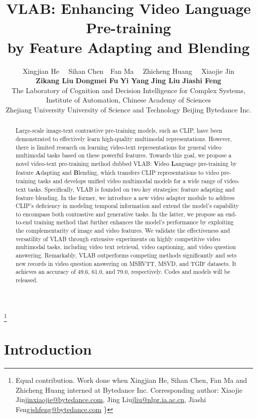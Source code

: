 \documentclass{article}
\title{VLAB: Enhancing Video Language Pre-training \\by Feature Adapting and Blending}
\author{
    Xingjian He \ \
    \enskip Sihan Chen\ \
    \enskip Fan Ma \ \
    \enskip Zhicheng Huang \ \
    \enskip Xiaojie Jin\textsuperscript{\Letter} \\
    \enskip \textbf{Zikang Liu}
    \enskip \textbf{Dongmei Fu} 
    \enskip \textbf{Yi Yang} 
    \enskip \textbf{Jing Liu}\textsuperscript{\Letter}
    \enskip \textbf{Jiashi Feng}\textsuperscript{\Letter} \\
 The Laboratory of Cognition and Decision Intelligence for Complex Systems,\\ Institute of Automation, Chinese Academy of Sciences \\ \quad  Zhejiang University
 \quad  University of Science and Technology Beijing \quad  Bytedance Inc.
}
\newcommand\blfootnote[1]{\begingroup
\renewcommand\thefootnote{}\footnote{#1}\addtocounter{footnote}{-1}\endgroup
}
\begin{document}
\blfootnote{Equal contribution. Work done when Xingjian He, Sihan Chen, Fan Ma and Zhicheng Huang interned at Bytedance Inc.  \newline \hspace*{1.9em}{\scriptsize \Letter} Corresponding author: Xiaojie Jin\url{jinxiaojie@bytedance.com}, Jing Liu\url{jliu@nlpr.ia.ac.cn}, Jiashi Feng\url{jshfeng@bytedance.com} \}}
\maketitle


\begin{abstract}
Large-scale image-text contrastive pre-training models, such as CLIP, have been demonstrated to effectively learn high-quality multimodal representations. However, there is limited research on learning video-text representations for general video multimodal tasks based on these powerful features. Towards this goal, we propose a novel video-text pre-training method dubbed VLAB: \textbf{V}ideo \textbf{L}anguage pre-training by feature \textbf{A}dapting and \textbf{B}lending, which transfers CLIP representations to video pre-training tasks and develops unified video multimodal models for a wide range of video-text tasks. Specifically, VLAB is founded on two key strategies: feature adapting and feature blending. In the former, we introduce a new video adapter module to address CLIP's deficiency in modeling temporal information and extend the model's capability to encompass both contrastive and generative tasks. In the latter, we propose an end-to-end training method that further enhances the model's performance by exploiting the complementarity of image and video features. We validate the effectiveness and versatility of VLAB through extensive experiments on highly competitive video multimodal tasks, including video text retrieval, video captioning, and video question answering. Remarkably, VLAB outperforms competing methods significantly and sets new records in video question answering on MSRVTT, MSVD, and TGIF datasets. It achieves an accuracy of 49.6, 61.0, and 79.0, respectively. Codes and models will be released.
\end{abstract}

\section{Introduction}
\vspace{-0.1cm}
\end{document}
